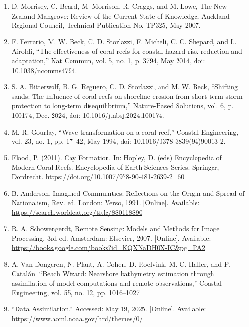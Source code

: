 \documentclass{article}
\begin{document}
\begin{sloppypar}
\begin{enumerate}
    \item{D. Morrisey, C. Beard, M. Morrison, R. Craggs, and M. Lowe, The New Zealand Mangrove: Review of the Current State of Knowledge, Auckland Regional Council, Technical Publication No. TP325, May 2007.}

    \item{F. Ferrario, M. W. Beck, C. D. Storlazzi, F. Micheli, C. C. Shepard, and L. Airoldi, “The effectiveness of coral reefs for coastal hazard risk reduction and adaptation,” Nat Commun, vol. 5, no. 1, p. 3794, May 2014, doi: 10.1038/ncomms4794.}

    \item{S. A. Bitterwolf, B. G. Reguero, C. D. Storlazzi, and M. W. Beck, “Shifting sands: The influence of coral reefs on shoreline erosion from short-term storm protection to long-term disequilibrium,” Nature-Based Solutions, vol. 6, p. 100174, Dec. 2024, doi: 10.1016/j.nbsj.2024.100174.}

    \item{M. R. Gourlay, “Wave transformation on a coral reef,” Coastal Engineering, vol. 23, no. 1, pp. 17–42, May 1994, doi: 10.1016/0378-3839(94)90013-2.}

    \item{Flood, P. (2011). Cay Formation. In: Hopley, D. (eds) Encyclopedia of Modern Coral Reefs. Encyclopedia of Earth Sciences Series. Springer, Dordrecht. https://doi.org/10.1007/978-90-481-2639-2_60}

    \item{B. Anderson, Imagined Communities: Reflections on the Origin and Spread of Nationalism, Rev. ed. London: Verso, 1991. [Online]. Available: \url{https://search.worldcat.org/title/880118890}}


    \item{R. A. Schowengerdt, Remote Sensing: Models and Methods for Image Processing, 3rd ed. Amsterdam: Elsevier, 2007. [Online]. Available: \url{https://books.google.com/books?id=KQXNaDH0X-IC&pg=PA2}}

    \item{A. Van Dongeren, N. Plant, A. Cohen, D. Roelvink, M. C. Haller, and P. Catalán, “Beach Wizard: Nearshore bathymetry estimation through assimilation of model computations and remote observations,” Coastal Engineering, vol. 55, no. 12, pp. 1016–1027}

    \item{“Data Assimilation.” Accessed: May 19, 2025. [Online]. Available: \url{https://www.aoml.noaa.gov/hrd/themes/0/}}


\end{enumerate}
\end{sloppypar}
\end{document}
